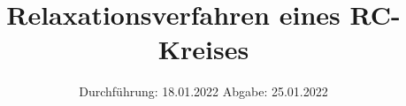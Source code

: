 

\subject{V353}
\title{Relaxationsverfahren eines RC-Kreises}
\date{%
  Durchführung: 18.01.2022
  \hspace{3em}
  Abgabe: 25.01.2022
}



\maketitle
\thispagestyle{empty}
\tableofcontents
\newpage






\printbibliography{}


